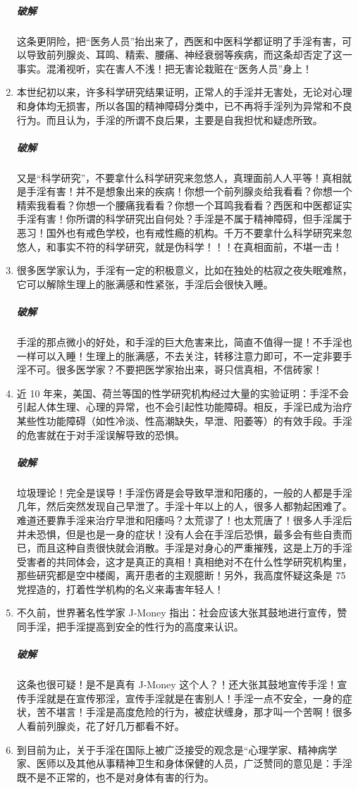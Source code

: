 \begin{enumerate}
    \subparagraph{破解} 这条更阴险，把“医务人员”抬出来了，西医和中医科学都证明了手淫有害，可以导致前列腺炎、耳鸣、精索、腰痛、神经衰弱等疾病，而这条却否定了这一事实。混淆视听，实在害人不浅！把无害论栽赃在“医务人员”身上！
    \item 本世纪初以来，许多科学研究结果证明，正常人的手淫并无害处，无论对心理和身体均无损害，所以各国的精神障碍分类中，已不再将手淫列为异常和不良行为。而且认为，手淫的所谓不良后果，主要是自我担忧和疑虑所致。
    \subparagraph{破解} 又是“科学研究”，不要拿什么科学研究来忽悠人，真理面前人人平等！真相就是手淫有害！并不是想象出来的疾病！你想一个前列腺炎给我看看？你想一个精索我看看？你想一个腰痛我看看？你想一个耳鸣我看看？西医和中医都证实手淫有害！你所谓的科学研究出自何处？手淫是不属于精神障碍，但手淫属于恶习！国外也有戒色学校，也有戒性瘾的机构。千万不要拿什么科学研究来忽悠人，和事实不符的科学研究，就是伪科学！！！在真相面前，不堪一击！
    \item 很多医学家认为，手淫有一定的积极意义，比如在独处的枯寂之夜失眠难熬，它可以解除生理上的胀满感和性紧张，手淫后会很快入睡。
    \subparagraph{破解} 手淫的那点微小的好处，和手淫的巨大危害来比，简直不值得一提！不手淫也一样可以入睡！生理上的胀满感，不去关注，转移注意力即可，不一定非要手淫不可。很多医学家？不要把医学家抬出来，哥只信真相，不信砖家！
    \item 近 10 年来，美国、荷兰等国的性学研究机构经过大量的实验证明：手淫不会引起人体生理、心理的异常，也不会引起性功能障碍。相反，手淫已成为治疗某些性功能障碍（如性冷淡、性高潮缺失，早泄、阳萎等）的有效手段。手淫的危害就在于对手淫误解导致的恐惧。
    \subparagraph{破解} 垃圾理论！完全是误导！手淫伤肾是会导致早泄和阳痿的，一般的人都是手淫几年，然后突然发现自己早泄了。手淫十年以上的人，很多人都勃起困难了。难道还要靠手淫来治疗早泄和阳痿吗？太荒谬了！也太荒唐了！很多人手淫后并未恐惧，但是也是一身的症状！没有人会在手淫后恐惧，最多会有些自责而已，而且这种自责很快就会消散。手淫是对身心的严重摧残，这是上万的手淫受害者的共同体会，这才是真正的真相！真相绝对不在什么性学研究机构里，那些研究都是空中楼阁，离开患者的主观臆断！另外，我高度怀疑这条是 75 党捏造的，打着性学机构的名义来毒害年轻人！
    \item 不久前，世界著名性学家 J-Money 指出：社会应该大张其鼓地进行宣传，赞同手淫，把手淫提高到安全的性行为的高度来认识。
    \subparagraph{破解} 这条也很可疑！是不是真有 J-Money 这个人？！还大张其鼓地宣传手淫！宣传手淫就是在宣传邪淫，宣传手淫就是在害别人！手淫一点不安全，一身的症状，苦不堪言！手淫是高度危险的行为，被症状缠身，那才叫一个苦啊！很多人看前列腺炎，花了好几万都看不好。
    \item 到目前为止，关于手淫在国际上被广泛接受的观念是“心理学家、精神病学家、医师以及其他从事精神卫生和身体保健的人员，广泛赞同的意见是：手淫既不是不正常的，也不是对身体有害的行为。

\end{enumerate}

